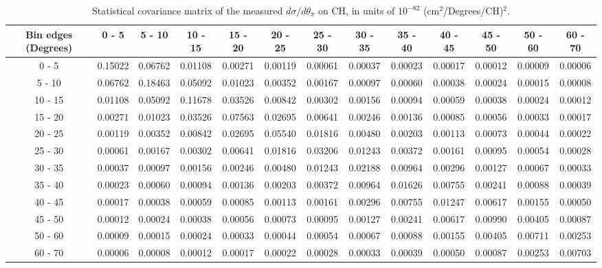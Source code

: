 \documentclass[aps,prl,twocolumn,superscriptaddress,nofootinbib]{revtex4-1}
\begin{document}
\begin{turnpage}
 \begin{table}[h!]
  \centering
  \caption{Statistical covariance matrix of the measured $d\sigma/d\theta_{\pi}$ on CH, in units of $10^{-82}$ (cm$^{2}$/Degrees/CH)$^{2}$.}
    \begin{tabular}{c||cccccccccccc}
      Bin edges (Degrees) & 0 - 5 & 5 - 10 & 10 - 15 & 15 - 20 & 20 - 25 & 25 - 30 & 30 - 35 & 35 - 40 & 40 - 45 & 45 - 50 & 50 - 60 & 60 - 70 \\
\hline \hline
        0 - 5 &  0.15022 &  0.06762 &  0.01108 &  0.00271 &  0.00119 &  0.00061 &  0.00037 &  0.00023 &  0.00017 &  0.00012 &  0.00009 &  0.00006 \\
       5 - 10 &  0.06762 &  0.18463 &  0.05092 &  0.01023 &  0.00352 &  0.00167 &  0.00097 &  0.00060 &  0.00038 &  0.00024 &  0.00015 &  0.00008 \\
      10 - 15 &  0.01108 &  0.05092 &  0.11678 &  0.03526 &  0.00842 &  0.00302 &  0.00156 &  0.00094 &  0.00059 &  0.00038 &  0.00024 &  0.00012 \\
      15 - 20 &  0.00271 &  0.01023 &  0.03526 &  0.07563 &  0.02695 &  0.00641 &  0.00246 &  0.00136 &  0.00085 &  0.00056 &  0.00033 &  0.00017 \\
      20 - 25 &  0.00119 &  0.00352 &  0.00842 &  0.02695 &  0.05540 &  0.01816 &  0.00480 &  0.00203 &  0.00113 &  0.00073 &  0.00044 &  0.00022 \\
      25 - 30 &  0.00061 &  0.00167 &  0.00302 &  0.00641 &  0.01816 &  0.03206 &  0.01243 &  0.00372 &  0.00161 &  0.00095 &  0.00054 &  0.00028 \\
      30 - 35 &  0.00037 &  0.00097 &  0.00156 &  0.00246 &  0.00480 &  0.01243 &  0.02188 &  0.00964 &  0.00296 &  0.00127 &  0.00067 &  0.00033 \\
      35 - 40 &  0.00023 &  0.00060 &  0.00094 &  0.00136 &  0.00203 &  0.00372 &  0.00964 &  0.01626 &  0.00755 &  0.00241 &  0.00088 &  0.00039 \\
      40 - 45 &  0.00017 &  0.00038 &  0.00059 &  0.00085 &  0.00113 &  0.00161 &  0.00296 &  0.00755 &  0.01247 &  0.00617 &  0.00155 &  0.00050 \\
      45 - 50 &  0.00012 &  0.00024 &  0.00038 &  0.00056 &  0.00073 &  0.00095 &  0.00127 &  0.00241 &  0.00617 &  0.00990 &  0.00405 &  0.00087 \\
      50 - 60 &  0.00009 &  0.00015 &  0.00024 &  0.00033 &  0.00044 &  0.00054 &  0.00067 &  0.00088 &  0.00155 &  0.00405 &  0.00711 &  0.00253 \\
      60 - 70 &  0.00006 &  0.00008 &  0.00012 &  0.00017 &  0.00022 &  0.00028 &  0.00033 &  0.00039 &  0.00050 &  0.00087 &  0.00253 &  0.00703 \\
    \end{tabular}
  \label{tablecov:CH_Statistical_ThetaPi}
  \end{table}
\end{turnpage}
\end{document}
